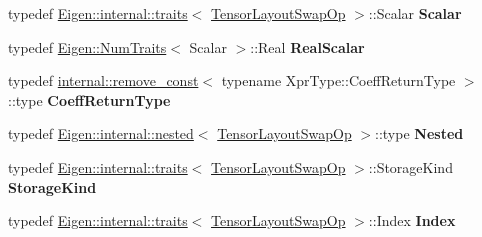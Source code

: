 \begin{DoxyCompactItemize}
\item 
\mbox{\label{class_eigen_1_1_tensor_layout_swap_op_a20ae6494c8a28efbe09d73aaa66255dc}} 
typedef \hyperlink{struct_eigen_1_1internal_1_1traits}{Eigen\+::internal\+::traits}$<$ \hyperlink{class_eigen_1_1_tensor_layout_swap_op}{Tensor\+Layout\+Swap\+Op} $>$\+::Scalar {\bfseries Scalar}
\item 
\mbox{\label{class_eigen_1_1_tensor_layout_swap_op_a87c5bb0704b7114dc1b4019891f8402f}} 
typedef \hyperlink{group___core___module_struct_eigen_1_1_num_traits}{Eigen\+::\+Num\+Traits}$<$ Scalar $>$\+::Real {\bfseries Real\+Scalar}
\item 
\mbox{\label{class_eigen_1_1_tensor_layout_swap_op_a6892c6df61670ebee33d496a221a9cf3}} 
typedef \hyperlink{struct_eigen_1_1internal_1_1remove__const}{internal\+::remove\+\_\+const}$<$ typename Xpr\+Type\+::\+Coeff\+Return\+Type $>$\+::type {\bfseries Coeff\+Return\+Type}
\item 
\mbox{\label{class_eigen_1_1_tensor_layout_swap_op_a72f43eaff0e169d4aa36ec685410ee21}} 
typedef \hyperlink{struct_eigen_1_1internal_1_1nested}{Eigen\+::internal\+::nested}$<$ \hyperlink{class_eigen_1_1_tensor_layout_swap_op}{Tensor\+Layout\+Swap\+Op} $>$\+::type {\bfseries Nested}
\item 
\mbox{\label{class_eigen_1_1_tensor_layout_swap_op_a3c68c85d4afc4847f13329183bc13510}} 
typedef \hyperlink{struct_eigen_1_1internal_1_1traits}{Eigen\+::internal\+::traits}$<$ \hyperlink{class_eigen_1_1_tensor_layout_swap_op}{Tensor\+Layout\+Swap\+Op} $>$\+::Storage\+Kind {\bfseries Storage\+Kind}
\item 
\mbox{\label{class_eigen_1_1_tensor_layout_swap_op_adf614acb71ffa78c84c9ba05d44116bb}} 
typedef \hyperlink{struct_eigen_1_1internal_1_1traits}{Eigen\+::internal\+::traits}$<$ \hyperlink{class_eigen_1_1_tensor_layout_swap_op}{Tensor\+Layout\+Swap\+Op} $>$\+::Index {\bfseries Index}
\end{DoxyCompactItemize}
